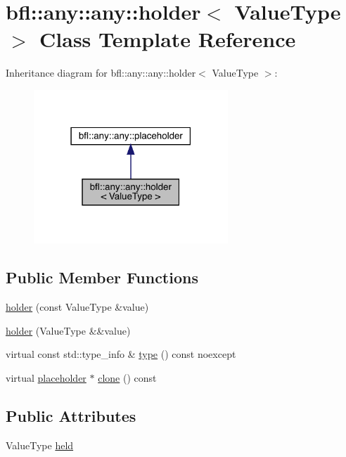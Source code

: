 \hypertarget{classbfl_1_1any_1_1any_1_1holder}{}\section{bfl\+:\+:any\+:\+:any\+:\+:holder$<$ Value\+Type $>$ Class Template Reference}
\label{classbfl_1_1any_1_1any_1_1holder}


Inheritance diagram for bfl\+:\+:any\+:\+:any\+:\+:holder$<$ Value\+Type $>$\+:
\nopagebreak
\begin{figure}[H]
\begin{center}
\leavevmode
\includegraphics[width=207pt]{classbfl_1_1any_1_1any_1_1holder__inherit__graph}
\end{center}
\end{figure}
\subsection*{Public Member Functions}
\begin{DoxyCompactItemize}
\item 
\mbox{\hyperlink{classbfl_1_1any_1_1any_1_1holder_a8dd0bda2fdff0140ea5b255b63863d9c}{holder}} (const Value\+Type \&value)
\item 
\mbox{\hyperlink{classbfl_1_1any_1_1any_1_1holder_a6c0d9a341712608c6b4e023c1904ed0b}{holder}} (Value\+Type \&\&value)
\item 
virtual const std\+::type\+\_\+info \& \mbox{\hyperlink{classbfl_1_1any_1_1any_1_1holder_a833f70296a6481da9f7d3e0e4d3120ae}{type}} () const noexcept
\item 
virtual \mbox{\hyperlink{classbfl_1_1any_1_1any_1_1placeholder}{placeholder}} $\ast$ \mbox{\hyperlink{classbfl_1_1any_1_1any_1_1holder_aa291292df117432eeac1950b3a2677b3}{clone}} () const
\end{DoxyCompactItemize}
\subsection*{Public Attributes}
\begin{DoxyCompactItemize}
\item 
Value\+Type \mbox{\hyperlink{classbfl_1_1any_1_1any_1_1holder_a07d3496553fcbf7f38c34b1150eeff9d}{held}}
\end{DoxyCompactItemize}
